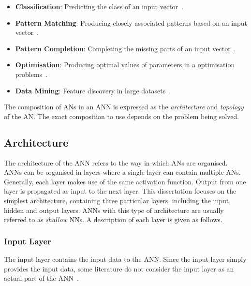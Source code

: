 \begin{itemize}
      \item \textbf{Classification}: Predicting the class of an input vector~\cite{ref:khan:2001}.

      \item \textbf{Pattern Matching}: Producing closely associated patterns based on an input vector~\cite{ref:cannady:1998, ref:kumar:1994}.

      \item \textbf{Pattern Completion}: Completing the missing parts of an input vector~\cite{ref:dayhoff:2001}.

      \item \textbf{Optimisation}: Producing optimal values of parameters in a optimisation problems~\cite{ref:specht:1991}.

      \item \textbf{Data Mining}: Feature discovery in large datasets~\cite{ref:singh:2009}.
\end{itemize}

The composition of \acp{AN} in an \acs{ANN} is expressed as the \textit{architecture} and \textit{topology} of the \acs{AN}. The exact composition to use depends on the problem being solved.

\subsection{Architecture} \label{sec:anns:anns:architecture}

The architecture of the \acs{ANN} refers to the way in which \acp{AN} are organised. \acp{ANN} can be organised in layers where a single layer can contain multiple \acp{AN}. Generally, each layer makes use of the same activation function. Output from one layer is propagated as input to the next layer. This dissertation focuses on the simplest architecture, containing three particular layers, including the input, hidden and output layers. \acp{ANN} with this type of architecture are usually referred to as \textit{shallow} \acp{NN}. A description of each layer is given as follows.

\subsubsection{Input Layer}\label{sec:anns:anns:architecture:input}

The input layer contains the input data to the \acs{ANN}. Since the input layer simply provides the input data, some literature do not consider the input layer as an actual part of the \acs{ANN}~\cite{ref:engelbrecht:2007}.


